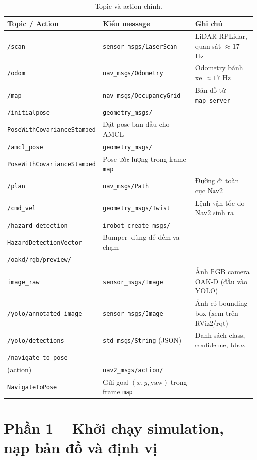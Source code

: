 \documentclass[a4paper,12pt]{article}
\begin{document}
\begin{table}[htbp]
\centering\footnotesize
\begin{tabular}{@{}p{4.3cm}p{5.2cm}p{4.9cm}@{}}
\toprule
\textbf{Topic / Action} & \textbf{Kiểu message} & \textbf{Ghi chú} \\\midrule
\texttt{/scan} & \texttt{sensor\_msgs/LaserScan} & LiDAR RPLidar, quan sát $\approx 17$ Hz \\
\texttt{/odom} & \texttt{nav\_msgs/Odometry} & Odometry bánh xe $\approx 17$ Hz \\
\texttt{/map} & \texttt{nav\_msgs/OccupancyGrid} & Bản đồ từ \texttt{map\_server} \\
\texttt{/initialpose} & \texttt{geometry\_msgs/}\\\texttt{PoseWithCovarianceStamped} & Đặt pose ban đầu cho AMCL \\
\texttt{/amcl\_pose} & \texttt{geometry\_msgs/}\\\texttt{PoseWithCovarianceStamped} & Pose ước lượng trong frame \texttt{map} \\
\texttt{/plan} & \texttt{nav\_msgs/Path} & Đường đi toàn cục Nav2 \\
\texttt{/cmd\_vel} & \texttt{geometry\_msgs/Twist} & Lệnh vận tốc do Nav2 sinh ra \\
\texttt{/hazard\_detection} & \texttt{irobot\_create\_msgs/}\\\texttt{HazardDetectionVector} & Bumper, dùng để đếm va chạm \\
\texttt{/oakd/rgb/preview/}\\\texttt{image\_raw} & \texttt{sensor\_msgs/Image} & Ảnh RGB camera OAK-D (đầu vào YOLO) \\
\texttt{/yolo/annotated\_image} & \texttt{sensor\_msgs/Image} & Ảnh có bounding box (xem trên RViz2/rqt) \\
\texttt{/yolo/detections} & \texttt{std\_msgs/String} (JSON) & Danh sách class, confidence, bbox \\
\texttt{/navigate\_to\_pose}\\(action) & \texttt{nav2\_msgs/action/}\\\texttt{NavigateToPose} & Gửi goal $(x,y,\text{yaw})$ trong frame \texttt{map} \\\bottomrule
\end{tabular}
\caption{Topic và action chính.}
\end{table}

\section{Phần 1 -- Khởi chạy simulation, nạp bản đồ và định vị}
\end{document}
